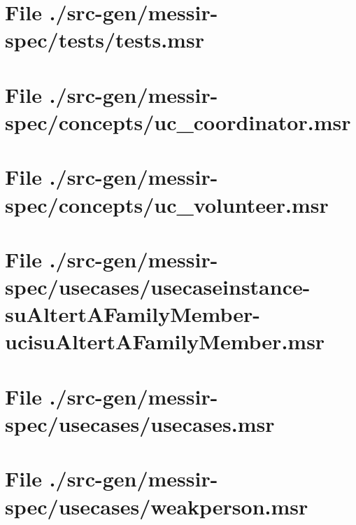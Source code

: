 \section[File /src-gen/messir-spec/tests/tests.msr]{File ./src-gen/messir-spec/tests/tests.msr}
\scriptsize

\normalsize
	
\section[File /src-gen/messir-spec/concepts/uc_coordinator.msr]{File ./src-gen/messir-spec/concepts/uc_coordinator.msr}
\scriptsize

\normalsize
	
\section[File /src-gen/messir-spec/concepts/uc_volunteer.msr]{File ./src-gen/messir-spec/concepts/uc_volunteer.msr}
\scriptsize

\normalsize
	
\section[File /.../usecaseinstance-suAltertAFamilyMember-ucisuAltertAFamilyMember.msr]{File ./src-gen/messir-spec/usecases/usecaseinstance-suAltertAFamilyMember-ucisuAltertAFamilyMember.msr}
\scriptsize

\normalsize
	
\section[File /src-gen/messir-spec/usecases/usecases.msr]{File ./src-gen/messir-spec/usecases/usecases.msr}
\scriptsize

\normalsize
	
\section[File /src-gen/messir-spec/usecases/weakperson.msr]{File ./src-gen/messir-spec/usecases/weakperson.msr}
\scriptsize

\normalsize
	
